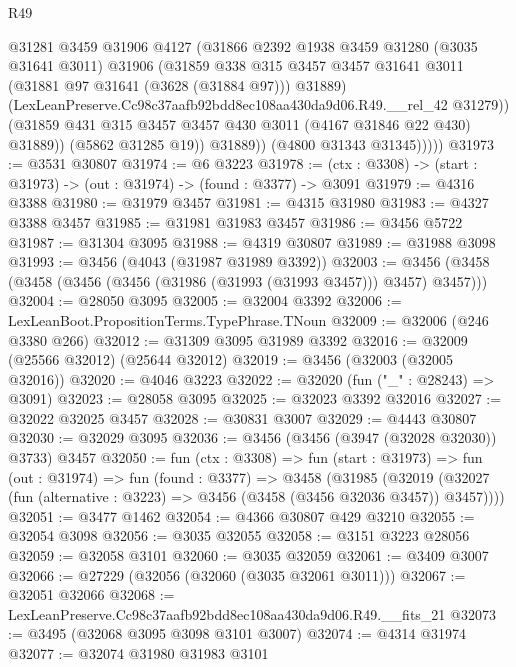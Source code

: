 \begin{lexlean}{R49}
\begin{coremodule}
                    @31281
                    @3459
                    @31906
                    @4127
                    (@31866
                      @2392
                      @1938
                      @3459
                      @31280
                      (@3035 @31641 @3011)
                      @31906
                      (@31859
                        @338
                        @315
                        @3457
                        @3457
                        @31641
                        @3011
                        (@31881 @97 @31641 (@3628 (@31884 @97)))
                        @31889)
                      (LexLeanPreserve.Cc98c37aafb92bdd8ec108aa430da9d06.R49.__rel_42 @31279))
                    (@31859 @431 @315 @3457 @3457 @430 @3011 (@4167 @31846 @22 @430) @31889))
                  (@5862 @31285 @19))
                @31889))
            (@4800 @31343 @31345)))))
@31973 := @3531 @30807
@31974 := @6 @3223
@31978 := (ctx : @3308) -> (start : @31973) -> (out : @31974) -> (found : @3377) -> @3091
@31979 := @4316 @3388
@31980 := @31979 @3457
@31981 := @4315 @31980
@31983 := @4327 @3388 @3457
@31985 := @31981 @31983 @3457
@31986 := @3456 @5722
@31987 := @31304 @3095
@31988 := @4319 @30807
@31989 := @31988 @3098
@31993 := @3456 (@4043 (@31987 @31989 @3392))
@32003 := @3456 (@3458 (@3458 (@3456 (@3456 (@31986 (@31993 (@31993 @3457))) @3457) @3457)))
@32004 := @28050 @3095
@32005 := @32004 @3392
@32006 := LexLeanBoot.PropositionTerms.TypePhrase.TNoun
@32009 := @32006 (@246 @3380 @266)
@32012 := @31309 @3095 @31989 @3392
@32016 := @32009 (@25566 @32012) (@25644 @32012)
@32019 := @3456 (@32003 (@32005 @32016))
@32020 := @4046 @3223
@32022 := @32020 (fun ("_" : @28243) => @3091)
@32023 := @28058 @3095
@32025 := @32023 @3392 @32016
@32027 := @32022 @32025 @3457
@32028 := @30831 @3007
@32029 := @4443 @30807
@32030 := @32029 @3095
@32036 := @3456 (@3456 (@3947 (@32028 @32030)) @3733) @3457
@32050 := fun (ctx : @3308) =>
  fun (start : @31973) =>
  fun (out : @31974) =>
  fun (found : @3377) =>
  @3458
    (@31985
      (@32019 (@32027 (fun (alternative : @3223) => @3456 (@3458 (@3456 @32036 @3457)) @3457))))
@32051 := @3477 @1462
@32054 := @4366 @30807 @429 @3210
@32055 := @32054 @3098
@32056 := @3035 @32055
@32058 := @3151 @3223 @28056
@32059 := @32058 @3101
@32060 := @3035 @32059
@32061 := @3409 @3007
@32066 := @27229 (@32056 (@32060 (@3035 @32061 @3011)))
@32067 := @32051 @32066
@32068 := LexLeanPreserve.Cc98c37aafb92bdd8ec108aa430da9d06.R49.__fits_21
@32073 := @3495 (@32068 @3095 @3098 @3101 @3007)
@32074 := @4314 @31974
@32077 := @32074 @31980 @31983 @3101

\end{coremodule}
\end{lexlean}
